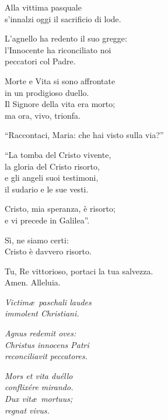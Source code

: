 
\setcounter{numstrofa}{0}

Alla vittima pasquale\\
s'innalzi oggi il sacrificio di lode.

\spazio

L'agnello ha redento il suo gregge:\\
l'Innocente ha riconciliato noi\\
peccatori col Padre.

\spazio

Morte e Vita si sono affrontate\\
in un prodigioso duello.\\
Il Signore della vita era morto;\\
ma ora, vivo, trionfa.

\spazio

``Raccontaci, Maria: che hai visto sulla via?''

\spazio

``La tomba del Cristo vivente,\\
la gloria del Cristo risorto,\\
e gli angeli suoi testimoni,\\
il sudario e le sue vesti.

\spazio

Cristo, mia speranza, è risorto;\\
e vi precede in Galilea''.

\spazio

Sì, ne siamo certi:\\
Cristo è davvero risorto.

\spazio

Tu, Re vittorioso, portaci la tua salvezza.\\
Amen. Alleluia.

\bigskip

\emph{Victim\ae\ paschali laudes\\
immolent Christiani.}

\spazio

\emph{Agnus redemit oves:\\
Christus innocens Patri\\
reconciliavit peccatores.}

\spazio

\emph{Mors et vita duéllo\\ 
conflixére mirando.\\
Dux vit\ae\ mortuus;\\
regnat vivus.}

